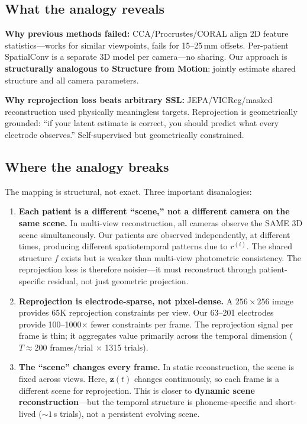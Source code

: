 \documentclass[11pt,letterpaper]{article}
\newcommand{\bfz}{\mathbf{z}}
\begin{document}
\subsection{What the analogy reveals}

\textbf{Why previous methods failed:} CCA/Procrustes/CORAL align 2D feature statistics---works for similar viewpoints, fails for 15--25\,mm offsets. Per-patient SpatialConv is a separate 3D model per camera---no sharing. Our approach is \textbf{structurally analogous to Structure from Motion}: jointly estimate shared structure and all camera parameters.

\textbf{Why reprojection loss beats arbitrary SSL:} JEPA/VICReg/masked reconstruction used physically meaningless targets. Reprojection is geometrically grounded: ``if your latent estimate is correct, you should predict what every electrode observes.'' Self-supervised but geometrically constrained.

\subsection{Where the analogy breaks}\label{sec:disanalogies}

The mapping is structural, not exact. Three important disanalogies:

\begin{enumerate}[leftmargin=2em]
\item \textbf{Each patient is a different ``scene,'' not a different camera on the same scene.} In multi-view reconstruction, all cameras observe the SAME 3D scene simultaneously. Our patients are observed independently, at different times, producing different spatiotemporal patterns due to $r^{(i)}$. The shared structure $f$ exists but is weaker than multi-view photometric consistency. The reprojection loss is therefore noisier---it must reconstruct through patient-specific residual, not just geometric projection.

\item \textbf{Reprojection is electrode-sparse, not pixel-dense.} A $256{\times}256$ image provides 65K reprojection constraints per view. Our 63--201 electrodes provide 100--1000$\times$ fewer constraints per frame. The reprojection signal per frame is thin; it aggregates value primarily across the temporal dimension ($T {\approx} 200$ frames/trial $\times$ 1315 trials).

\item \textbf{The ``scene'' changes every frame.} In static reconstruction, the scene is fixed across views. Here, $\bfz(t)$ changes continuously, so each frame is a different scene for reprojection. This is closer to \textbf{dynamic scene reconstruction}---but the temporal structure is phoneme-specific and short-lived (${\sim}1$\,s trials), not a persistent evolving scene.
\end{enumerate}
\end{document}
